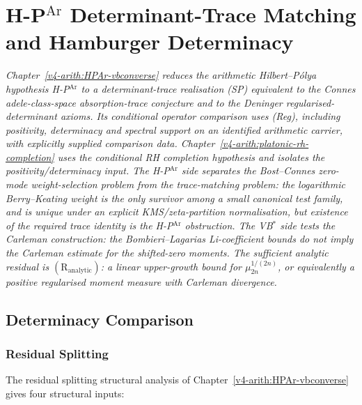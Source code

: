\chapter{H-P\(^{\mathrm{Ar}}\) Determinant-Trace Matching and Hamburger Determinacy}
\label{v4-arith:hpar-det}

\emph{Chapter~\ref{v4-arith:HPAr-vbconverse} reduces the arithmetic
Hilbert--P\'olya hypothesis H-P\(^{\mathrm{Ar}}\) to a determinant-trace
realisation (SP) equivalent to the Connes adele-class-space
absorption-trace conjecture and to the Deninger regularised-determinant
axioms. Its conditional operator comparison uses (Reg), including
positivity, determinacy and spectral support on an identified
arithmetic carrier, with explicitly supplied comparison data.
Chapter~\ref{v4-arith:platonic-rh-completion} uses the conditional
RH completion hypothesis and isolates the positivity/determinacy input.
The H-P\(^{\mathrm{Ar}}\) side separates
the Bost--Connes zero-mode \emph{weight-selection} problem from the
trace-matching problem: the logarithmic Berry--Keating weight is the
only survivor among a small canonical test family, and is unique under
an explicit KMS/zeta-partition normalisation, but existence of the
required trace identity is the H-P\(^{\mathrm{Ar}}\) obstruction.
The VB\(^{*}\) side tests the Carleman construction: the
Bombieri--Lagarias Li-coefficient bounds do not imply the Carleman
estimate for the shifted-zero moments. The sufficient analytic residual is
\((\mathrm{R}_{\mathrm{analytic}})\): a linear upper-growth bound for
\(\mu_{2n}^{1/(2n)}\), or equivalently a positive regularised
moment measure with Carleman divergence.}

\section{Determinacy Comparison}
\label{v4-arith:hpar-det:context}

\subsection{Residual Splitting}
\label{v4-arith:hpar-det:wave2-recap}

The residual splitting structural analysis of
Chapter~\ref{v4-arith:HPAr-vbconverse} gives four structural inputs:


